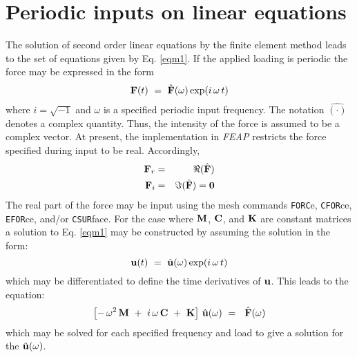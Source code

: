 \section{Periodic inputs on linear equations}
\label{periodic}

The solution of second order linear equations by the finite element method
leads to the set of equations given by Eq. \ref{eqm1}.
If the applied loading is periodic the force may be expressed in the form
\begin{equation}
\label{eq2}
\mathbf{F}(t) ~=~ \hat{\mathbf{F}}(\omega) \exp (i \, \omega \, t)
\end{equation}
where $i = \sqrt{-1}$ and $\omega$ is a specified periodic input frequency.
The notation $\hat{(\cdot)}$ denotes a complex quantity.  Thus,
the intensity of the force is assumed to be a complex vector.  At present,
the implementation in {\sl FEAP} restricts the force specified during
input to be real. Accordingly,
\begin{eqnarray}
\label{eq3}
\mathbf{F}_r &=& \Re ( \hat{\mathbf{F}} ) \\
\mathbf{F}_i &=& \Im ( \hat{\mathbf{F}} ) = \mathbf{0}
\end{eqnarray}
The real part of the force may be input using the mesh commands {\tt FORC}e,
{\tt CFOR}ce,  {\tt EFOR}ce, and/or {\tt CSUR}face.
For the case where $\mathbf{M}$, $\mathbf{C}$, and $\mathbf{K}$ are constant matrices a
solution to Eq. \ref{eqm1} may be constructed by assuming the solution
in the form:
\begin{equation}
\label{eq4}
\mathbf{u}(t) ~=~ \hat{\mathbf{u}}(\omega) \exp (i \, \omega \, t)
\end{equation}
which may be differentiated to define the time derivatives of $\mathbf{u}$.
This leads to the equation:
\begin{equation}
\label{eq5}
\left[ - \, \omega^2 \, \mathbf{M} ~+~ i \, \omega \, \mathbf{C} ~+~ \mathbf{K} \right] \,
\hat{\mathbf{u}}(\omega) ~=~ \ \hat{\mathbf{F}} (\omega)
\end{equation}
which may be solved for each specified frequency and load to give a
solution for the $\hat{\mathbf{u}}(\omega)$.

